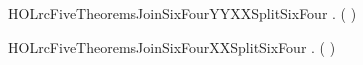 \begin{SaveVerbatim}{HOLrcFiveTheoremsJoinSixFourYYXXSplitSixFour}
\HOLTokenTurnstile{} \HOLSymConst{\HOLTokenForall{}}.  ( ) \HOLSymConst{=} 
\end{SaveVerbatim}
\newcommand{\HOLrcFiveTheoremsJoinSixFourYYXXSplitSixFour}{\UseVerbatim{HOLrcFiveTheoremsJoinSixFourYYXXSplitSixFour}}
\begin{SaveVerbatim}{HOLrcFiveTheoremsJoinSixFourXXSplitSixFour}
\HOLTokenTurnstile{} \HOLSymConst{\HOLTokenForall{}}.  ( ) \HOLSymConst{=} 
\end{SaveVerbatim}
\newcommand{\HOLrcFiveTheoremsJoinSixFourXXSplitSixFour}{\UseVerbatim{HOLrcFiveTheoremsJoinSixFourXXSplitSixFour}}
